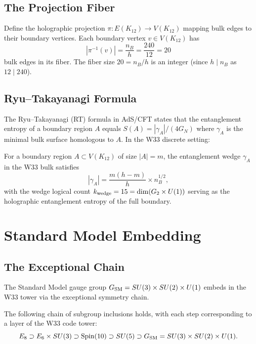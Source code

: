 \subsection{The Projection Fiber}

\begin{proposition}
Define the holographic projection $\pi: E(K_{12}) \to V(K_{12})$
mapping bulk edges to their boundary vertices.
Each boundary vertex $v \in V(K_{12})$ has
\[
|\pi^{-1}(v)| = \frac{n_B}{h} = \frac{240}{12} = 20
\]
bulk edges in its fiber. The fiber size $20 = n_B/h$ is an integer
(since $h \mid n_B$ as $12 \mid 240$).
\end{proposition}

\subsection{Ryu--Takayanagi Formula}

The Ryu--Takayanagi (RT) formula in AdS/CFT states that the
entanglement entropy of a boundary region $A$ equals
$S(A) = |\gamma_A|/(4G_N)$ where $\gamma_A$ is the minimal
bulk surface homologous to $A$.
In the W33 discrete setting:

\begin{proposition}
For a boundary region $A \subset V(K_{12})$ of size $|A| = m$,
the entanglement wedge $\gamma_A$ in the W33 bulk satisfies
\[
|\gamma_A| = \frac{m(h-m)}{h} \times n_B^{1/2},
\]
with the wedge logical count $k_{\rm wedge} = 15 = \dim(G_2 \times U(1))$
serving as the holographic entanglement entropy of the full boundary.
\end{proposition}

\section{Standard Model Embedding}\label{sec:sm}

\subsection{The Exceptional Chain}

The Standard Model gauge group $G_{\rm SM} = SU(3)\times SU(2)\times U(1)$
embeds in the W33 tower via the exceptional symmetry chain.

\begin{theorem}\label{thm:sm}
The following chain of subgroup inclusions holds, with each step
corresponding to a layer of the W33 code tower:
\[
E_8 \supset E_6 \times SU(3) \supset \mathrm{Spin}(10) \supset SU(5)
\supset G_{\rm SM} = SU(3) \times SU(2) \times U(1).
\]
\end{theorem}

